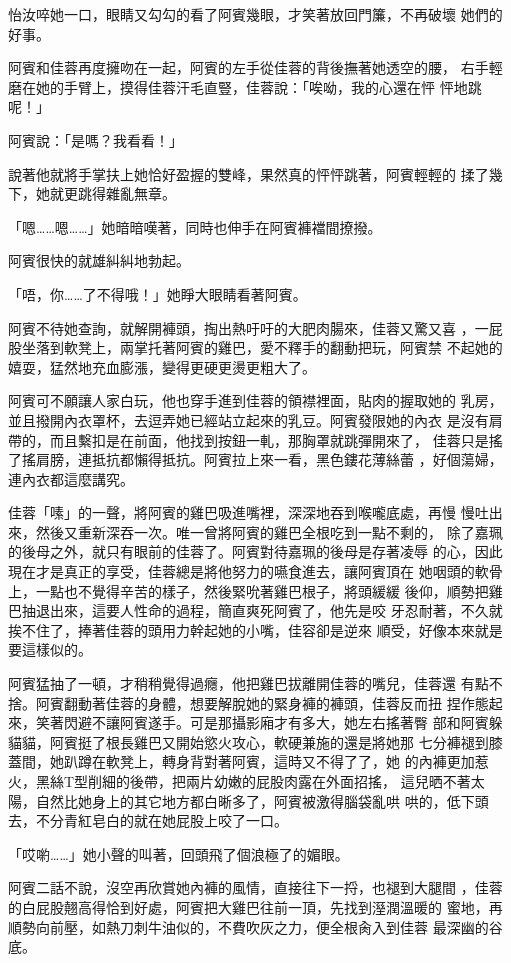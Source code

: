 怡汝啐她一口，眼睛又勾勾的看了阿賓幾眼，才笑著放回門簾，不再破壞
她們的好事。

阿賓和佳蓉再度擁吻在一起，阿賓的左手從佳蓉的背後撫著她透空的腰，
右手輕磨在她的手臂上，摸得佳蓉汗毛直豎，佳蓉說：「唉呦，我的心還在怦
怦地跳呢！」

阿賓說：「是嗎？我看看！」

說著他就將手掌扶上她恰好盈握的雙峰，果然真的怦怦跳著，阿賓輕輕的
揉了幾下，她就更跳得雜亂無章。

「嗯……嗯……」她暗暗嘆著，同時也伸手在阿賓褲襠間撩撥。

阿賓很快的就雄糾糾地勃起。

「唔，你……了不得哦！」她睜大眼睛看著阿賓。

阿賓不待她查詢，就解開褲頭，掏出熱吁吁的大肥肉腸來，佳蓉又驚又喜
，一屁股坐落到軟凳上，兩掌托著阿賓的雞巴，愛不釋手的翻動把玩，阿賓禁
不起她的嬉耍，猛然地充血膨漲，變得更硬更燙更粗大了。

阿賓可不願讓人家白玩，他也穿手進到佳蓉的領襟裡面，貼肉的握取她的
乳房，並且撥開內衣罩杯，去逗弄她已經站立起來的乳豆。阿賓發限她的內衣
是沒有肩帶的，而且繫扣是在前面，他找到按鈕一軋，那胸罩就跳彈開來了，
佳蓉只是搖了搖肩膀，連抵抗都懶得抵抗。阿賓拉上來一看，黑色鏤花薄絲蕾
，好個蕩婦，連內衣都這麼講究。

佳蓉「嗉」的一聲，將阿賓的雞巴吸進嘴裡，深深地吞到喉嚨底處，再慢
慢吐出來，然後又重新深吞一次。唯一曾將阿賓的雞巴全根吃到一點不剩的，
除了嘉珮的後母之外，就只有眼前的佳蓉了。阿賓對待嘉珮的後母是存著凌辱
的心，因此現在才是真正的享受，佳蓉總是將他努力的嚥食進去，讓阿賓頂在
她咽頭的軟骨上，一點也不覺得辛苦的樣子，然後緊吮著雞巴根子，將頭緩緩
後仰，順勢把雞巴抽退出來，這要人性命的過程，簡直爽死阿賓了，他先是咬
牙忍耐著，不久就挨不住了，捧著佳蓉的頭用力幹起她的小嘴，佳容卻是逆來
順受，好像本來就是要這樣似的。

阿賓猛抽了一頓，才稍稍覺得過癮，他把雞巴拔離開佳蓉的嘴兒，佳蓉還
有點不捨。阿賓翻動著佳蓉的身體，想要解脫她的緊身褲的褲頭，佳蓉反而扭
捏作態起來，笑著閃避不讓阿賓遂手。可是那攝影廂才有多大，她左右搖著臀
部和阿賓躲貓貓，阿賓挺了根長雞巴又開始慾火攻心，軟硬兼施的還是將她那
七分褲褪到膝蓋間，她趴蹲在軟凳上，轉身背對著阿賓，這時又不得了了，她
的內褲更加惹火，黑絲T型削細的後帶，把兩片幼嫩的屁股肉露在外面招搖，
這兒晒不著太陽，自然比她身上的其它地方都白晰多了，阿賓被激得腦袋亂哄
哄的，低下頭去，不分青紅皂白的就在她屁股上咬了一口。

「哎喲……」她小聲的叫著，回頭飛了個浪極了的媚眼。

阿賓二話不說，沒空再欣賞她內褲的風情，直接往下一捋，也褪到大腿間
，佳蓉的白屁股翹高得恰到好處，阿賓把大雞巴往前一頂，先找到溼潤溫暖的
蜜地，再順勢向前壓，如熱刀刺牛油似的，不費吹灰之力，便全根肏入到佳蓉
最深幽的谷底。

